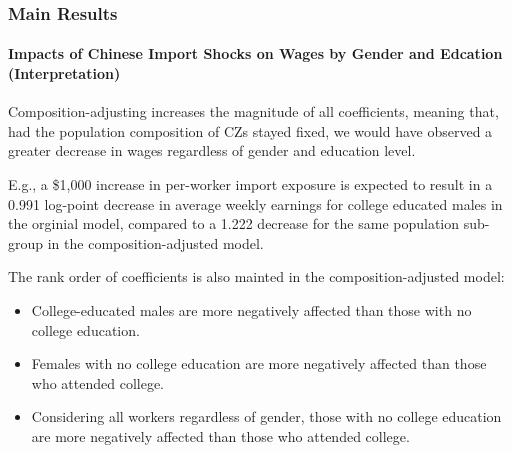 \begin{frame}
    \frametitle{Main Results}
    \framesubtitle{Impacts of Chinese Import Shocks on Wages by Gender and Edcation (Interpretation)}

    Composition-adjusting increases the magnitude of all coefficients, meaning that, had the population composition of CZs stayed fixed, we would have observed a greater decrease in wages regardless of gender and education level.
        
    E.g., a \$1,000 increase in per-worker import exposure is expected to result in a 0.991 log-point decrease in average weekly earnings for college educated males in the orginial model, compared to a 1.222 decrease for the same population sub-group in the composition-adjusted model.
    
    The rank order of coefficients is also mainted in the composition-adjusted model: 
    \begin{itemize}
        \item College-educated males are more negatively affected than those with no college education.
        
        \item Females with no college education are more negatively affected than those who attended college.
    
        \item Considering all workers regardless of gender, those with no college education are more negatively affected than those who attended college.
        \end{itemize}
        
\end{frame}